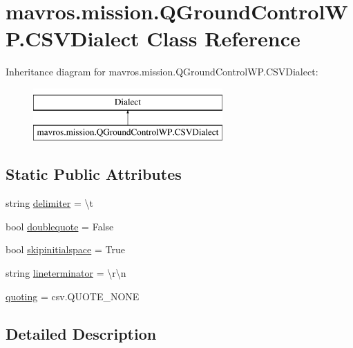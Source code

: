 \hypertarget{classmavros_1_1mission_1_1QGroundControlWP_1_1CSVDialect}{}\section{mavros.\+mission.\+Q\+Ground\+Control\+W\+P.\+C\+S\+V\+Dialect Class Reference}
\label{classmavros_1_1mission_1_1QGroundControlWP_1_1CSVDialect}
Inheritance diagram for mavros.\+mission.\+Q\+Ground\+Control\+W\+P.\+C\+S\+V\+Dialect\+:\begin{figure}[H]
\begin{center}
\leavevmode
\includegraphics[height=2.000000cm]{classmavros_1_1mission_1_1QGroundControlWP_1_1CSVDialect}
\end{center}
\end{figure}
\subsection*{Static Public Attributes}
\begin{DoxyCompactItemize}
\item 
string \mbox{\hyperlink{classmavros_1_1mission_1_1QGroundControlWP_1_1CSVDialect_a7a04335e05897b036794fc4e8d1af567}{delimiter}} = \textquotesingle{}\textbackslash{}t\textquotesingle{}
\item 
bool \mbox{\hyperlink{classmavros_1_1mission_1_1QGroundControlWP_1_1CSVDialect_a27ffd69b227ffe19bb03744266f7bf13}{doublequote}} = False
\item 
bool \mbox{\hyperlink{classmavros_1_1mission_1_1QGroundControlWP_1_1CSVDialect_a5165d88af04a87e06616aef36c57b23d}{skipinitialspace}} = True
\item 
string \mbox{\hyperlink{classmavros_1_1mission_1_1QGroundControlWP_1_1CSVDialect_aa021f259aa6fdd8983d83ad4a063feed}{lineterminator}} = \textquotesingle{}\textbackslash{}r\textbackslash{}n\textquotesingle{}
\item 
\mbox{\hyperlink{classmavros_1_1mission_1_1QGroundControlWP_1_1CSVDialect_a5b83430985e67da10adba7ebf5347c42}{quoting}} = csv.\+Q\+U\+O\+T\+E\+\_\+\+N\+O\+NE
\end{DoxyCompactItemize}


\subsection{Detailed Description}


